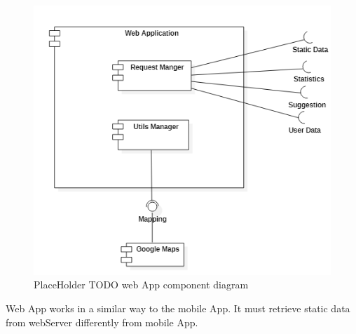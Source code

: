 \begin{figure}[H]
\centering
\includegraphics{Images/WebAppComponent.png}
\caption{\label{fig:ComWI}PlaceHolder TODO web App component diagram}
\end{figure}
Web App works in a similar way to the mobile App. It must retrieve static data from webServer differently from mobile App.
